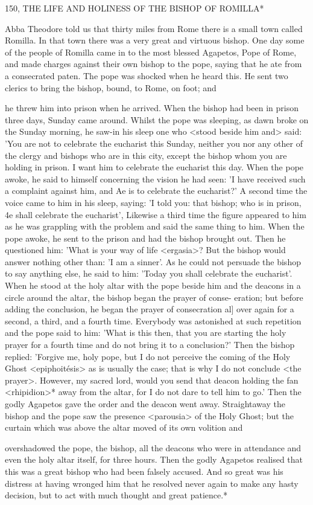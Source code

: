 150, THE LIFE AND HOLINESS
OF THE BISHOP OF ROMILLA*

Abba Theodore told us that thirty miles from Rome there is a small
town called Romilla.
In that town there was a very great and
virtuous bishop.
One day some of the people of Romilla came in to
the most blessed Agapetos, Pope of Rome, and made charges
against their own bishop to the pope, saying that he ate from a
consecrated paten.
The pope was shocked when he heard this.
He
sent two clerics to bring the bishop, bound, to Rome, on foot; and

he threw him into prison when he arrived.
When the bishop had
been in prison three days, Sunday came around.
Whilst the pope
was sleeping, as dawn broke on the Sunday morning, he saw-in his
sleep one who <stood beside him and> said: 'You are not to
celebrate the eucharist this Sunday, neither you nor any other of the
clergy and bishops who are in this city, except the bishop whom you
are holding in prison.
I want him to celebrate the eucharist this day.
When the pope awoke, he said to himself concerning the vision he
had seen: 'I have received such a complaint against him, and Ae is
to celebrate the eucharist?' A second time the voice came to him in
his sleep, saying: 'I told you: that bishop; who is in prison, 4e shall
celebrate the eucharist', Likewise a third time the figure appeared to
him as he was grappling with the problem and said the same thing
to him.
When the pope awoke, he sent to the prison and had the
bishop brought out.
Then he questioned him: 'What is your way of
life <ergasia>? But the bishop would answer nothing other than: 'I
am a sinner'.
As he could not persuade the bishop to say anything
else, he said to him: 'Today you shall celebrate the eucharist'.
When
he stood at the holy altar with the pope beside him and the deacons
in a circle around the altar, the bishop began the prayer of conse-
eration; but before adding the conclusion, he began the prayer of
consecration al] over again for a second, a third, and a fourth time.
Everybody was astonished at such repetition and the pope said to
him: 'What is this then, that you are starting the holy prayer for a
fourth time and do not bring it to a conclusion?' Then the bishop
replied: 'Forgive me, holy pope, but I do not perceive the coming
of the Holy Ghost <epiphoitésis> as is usually the case; that is why
I do not conclude <the prayer>.
However, my sacred lord, would
you send that deacon holding the fan <rhipidion>* away from the
altar, for I do not dare to tell him to go.' Then the godly Agapetos
gave the order and the deacon went away.
Straightaway the bishop
and the pope saw the presence <parousia> of the Holy Ghost; but
the curtain which was above the altar moved of its own volition and

overshadowed the pope, the bishop, all the deacons who were in
attendance and even the holy altar itself, for three hours.
Then the
godly Agapetos realised that this was a great bishop who had been
falsely accused.
And so great was his distress at having wronged him
that he resolved never again to make any hasty decision, but to act
with much thought and great patience.*

